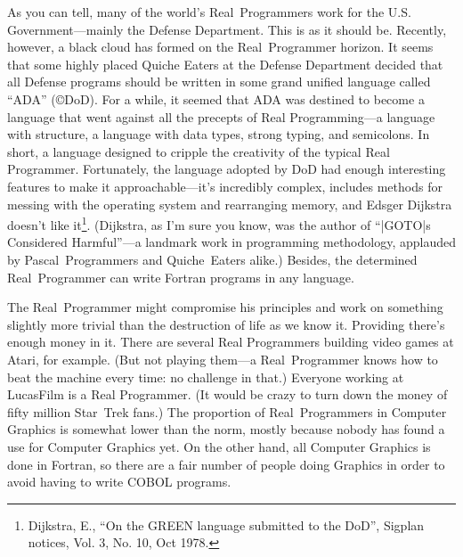 \documentclass[10pt,letterpaper]{article}
\newcommand{\acro}[1]{{\small #1\spacefactor1000}}
\begin{document}
As you can tell, many of the world's Real~Programmers work for the
U.S. Government---mainly the Defense Department. This is as it should
be. Recently, however, a black cloud has formed on the Real~Programmer
horizon. It seems that some highly placed Quiche Eaters at the Defense
Department decided that all Defense programs should be written in some
grand unified language called ``\acro{ADA}'' (\copyright DoD). For a while, it seemed
that \acro{ADA} was destined to become a language that went against all the
precepts of Real Programming---a language with structure, a language
with data types, strong typing, and semicolons. In short, a language
designed to cripple the creativity of the typical Real
Programmer. Fortunately, the language adopted by DoD had enough
interesting features to make it approachable---it's incredibly
complex, includes methods for messing with the operating system and
rearranging memory, and Edsger Dijkstra doesn't like it\footnote{%
Dijkstra, E., ``On the GREEN language submitted to the DoD'', Sigplan notices, Vol. 3, No. 10, Oct 1978.}.
(Dijkstra, as I'm sure you know, was the author of ``|GOTO|s
Considered Harmful''---a landmark work in programming methodology,
applauded by Pascal~Programmers and Quiche~Eaters alike.) Besides, the
determined Real~Programmer can write Fortran programs in any language.

The Real~Programmer might compromise his principles and work on
something slightly more trivial than the destruction of life as we
know it. Providing there's enough money in it. There are several Real
Programmers building video games at Atari, for example. (But not
playing them---a Real~Programmer knows how to beat the machine every
time: no challenge in that.) Everyone working at LucasFilm is a Real
Programmer. (It would be crazy to turn down the money of fifty million
Star~Trek fans.) The proportion of Real~Programmers in Computer
Graphics is somewhat lower than the norm, mostly because nobody has
found a use for Computer Graphics yet. On the other hand, all Computer
Graphics is done in Fortran, so there are a fair number of people
doing Graphics in order to avoid having to write \acro{COBOL} programs.
\end{document}
